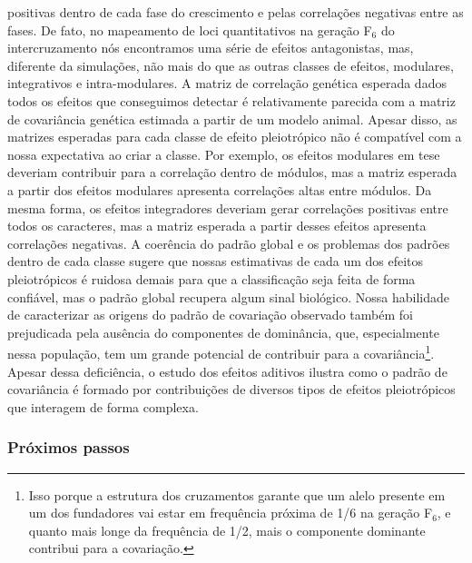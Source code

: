 \begin{refsection}
positivas dentro de cada fase do crescimento e pelas correlações negativas
entre as fases. De fato, no mapeamento de loci quantitativos na geração F$_6$
do intercruzamento nós encontramos uma série de efeitos antagonistas, mas,
diferente da simulações, não mais do que as outras classes de efeitos,
modulares, integrativos e intra-modulares. A matriz de correlação genética
esperada dados todos os efeitos que conseguimos detectar é relativamente
parecida com a matriz de covariância genética estimada a partir de um modelo
animal. Apesar disso, as matrizes esperadas para cada classe de efeito
pleiotrópico não é compatível com a nossa expectativa ao criar a classe. Por
exemplo, os efeitos modulares em tese deveriam contribuir para a correlação
dentro de módulos, mas a matriz esperada a partir dos efeitos modulares
apresenta correlações altas entre módulos. Da mesma forma, os efeitos
integradores deveriam gerar correlações positivas entre todos os caracteres,
mas a matriz esperada a partir desses efeitos apresenta correlações negativas.
A coerência do padrão global e os problemas dos padrões dentro de cada classe
sugere que nossas estimativas de cada um dos efeitos pleiotrópicos é ruidosa
demais para que a classificação seja feita de forma confiável, mas o padrão
global recupera algum sinal biológico. Nossa habilidade de caracterizar as
origens do padrão de covariação observado também foi prejudicada pela ausência
do componentes de dominância, que, especialmente nessa população, tem um
grande potencial de contribuir para a covariância\footnote{Isso porque a
estrutura dos cruzamentos garante que um alelo presente em um dos fundadores
vai estar em frequência próxima de 1/6 na geração F$_6$, e quanto mais longe
da frequência de 1/2, mais o componente dominante contribui para a
covariação.}. Apesar dessa deficiência, o estudo dos efeitos aditivos ilustra
como o padrão de covariância é formado por contribuições de diversos tipos de
efeitos pleiotrópicos que interagem de forma complexa.

\subsubsection{Próximos passos}


\end{refsection}
